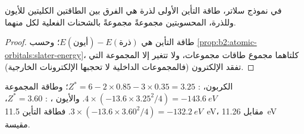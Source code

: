 \begin{proposition}\label{prop:b2:atomic-orbitals:ionisation}
في نموذج سلاتر، طاقة التأين الأولى لذرة هي الفرق
بين الطاقتين الكليتين للأيون وللذرة، المحسوبتين مجموعةً مجموعةً
بالشحنات الفعلية لكل منهما.
\end{proposition}

\begin{proof}
طاقة التأين هي $E(\text{أيون}) - E(\text{ذرة})$؛ وحسب
\cref{prop:b2:atomic-orbitals:slater-energy}، كلتاهما مجموع طاقات مجموعات، 
ولا تتغير إلا المجموعة التي تفقد الإلكترون (فالمجموعات الداخلية لا تحجبها
الإلكترونات الخارجية).
\end{proof}

\begin{example}[الكربون]\label{ex:b2:atomic-orbitals:carbon}
الكربون، : $Z^* = 6 - 2 \times 0.85 - 3 \times 0.35 = 3.25$؛ وطاقة المجموعة
$4 \times (-13.6 \times 3.25^2/4) = \qty{-143.6}{eV}$. والأيون ، : $Z^* =
3.60$، $3 \times (-13.6 \times 3.60^2/4) = \qty{-132.2}{eV}$. فطاقة التأين
\qty{11.5}{eV}، مقابل \qty{11.26}{eV} مقيسة.
\end{example}

